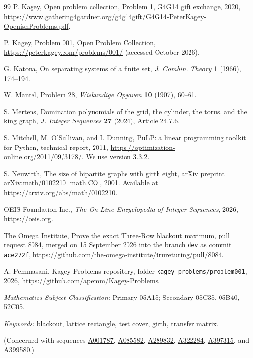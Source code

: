 \documentclass[12pt]{article}
\theoremstyle{plain}
\theoremstyle{definition}
\theoremstyle{remark}
\newcommand{\seqnum}[1]{\href{https://oeis.org/#1}{\rm \underline{#1}}}
\begin{document}
\begin{thebibliography}{99}
P. Kagey, Open problem collection, Problem 1, G4G14 gift exchange, 2020,
\url{https://www.gathering4gardner.org/g4g14gift/G4G14-PeterKagey-OpenishProblems.pdf}.

P. Kagey, Problem 001, Open Problem Collection,
\url{https://peterkagey.com/problems/001/} (accessed October 2026).

G. Katona, On separating systems of a finite set, \emph{J. Combin. Theory}
\textbf{1} (1966), 174--194.

W. Mantel, Problem 28, \emph{Wiskundige Opgaven} \textbf{10} (1907), 60--61.

S. Mertens, Domination polynomials of the grid, the cylinder, the torus, and the king
graph, \emph{J. Integer Sequences} \textbf{27} (2024), Article 24.7.6.

S. Mitchell, M. O'Sullivan, and I. Dunning, PuLP: a linear programming toolkit for
Python, technical report, 2011, \url{https://optimization-online.org/2011/09/3178/}.
We use version 3.3.2.

S. Neuwirth, The size of bipartite graphs with girth eight, arXiv preprint
arXiv:math/0102210 [math.CO], 2001. Available at
\url{https://arxiv.org/abs/math/0102210}.

OEIS Foundation Inc., \emph{The On-Line Encyclopedia of Integer Sequences}, 2026,
\url{https://oeis.org}.

The Omega Institute, Prove the exact Three-Row blackout maximum, pull request 8084,
merged on 15 September 2026 into the branch \texttt{dev} as commit \texttt{ace272f},
\url{https://github.com/the-omega-institute/trureturing/pull/8084}.


A. Pemmasani, Kagey-Problems repository, folder \texttt{kagey-problems/problem001},
2026, \url{https://github.com/apemm/Kagey-Problems}.

\end{thebibliography}

 {\it Mathematics Subject Classification}: Primary 05A15; Secondary
05C35, 05B40, 52C05.

\noindent \emph{Keywords:} blackout, lattice rectangle, test cover, girth, transfer matrix.

\noindent (Concerned with sequences
\seqnum{A001787},
\seqnum{A085582},
\seqnum{A289832},
\seqnum{A322284},
\seqnum{A397315}, and
\seqnum{A399580}.)
\end{document}

